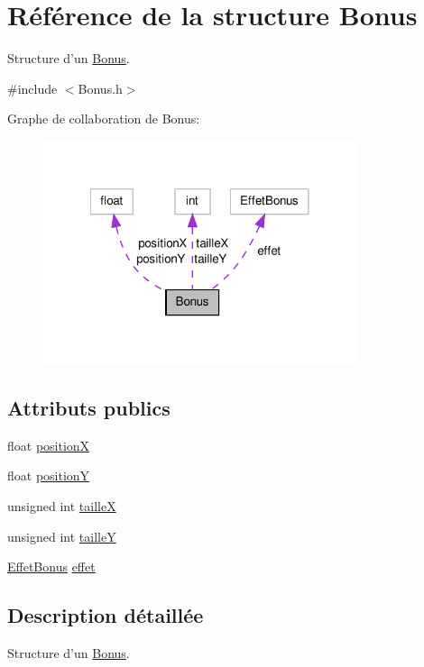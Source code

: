 \hypertarget{structBonus}{\section{Référence de la structure Bonus}
\label{structBonus}
}


Structure d'un \hyperlink{structBonus}{Bonus}.  




{\ttfamily \#include $<$Bonus.\-h$>$}



Graphe de collaboration de Bonus\-:\nopagebreak
\begin{figure}[H]
\begin{center}
\leavevmode
\includegraphics[width=260pt]{structBonus__coll__graph}
\end{center}
\end{figure}
\subsection*{Attributs publics}
\begin{DoxyCompactItemize}
\item 
float \hyperlink{structBonus_a299226996e549498df83b3768d3b43af}{position\-X}
\item 
float \hyperlink{structBonus_aa5cc7fbc0c3fe6b014900c7223a1d6cb}{position\-Y}
\item 
unsigned int \hyperlink{structBonus_aede925340da983fdddf1f901c976e00a}{taille\-X}
\item 
unsigned int \hyperlink{structBonus_ae570700aa309f6de2f91fc84ddb409c2}{taille\-Y}
\item 
\hyperlink{EffetBonus_8h_a5c3ffd6a343fb8d5f63c87ee1a37a7fe}{Effet\-Bonus} \hyperlink{structBonus_a0619fdbeba9edd702a607887a7f79f62}{effet}
\end{DoxyCompactItemize}


\subsection{Description détaillée}
Structure d'un \hyperlink{structBonus}{Bonus}. 

